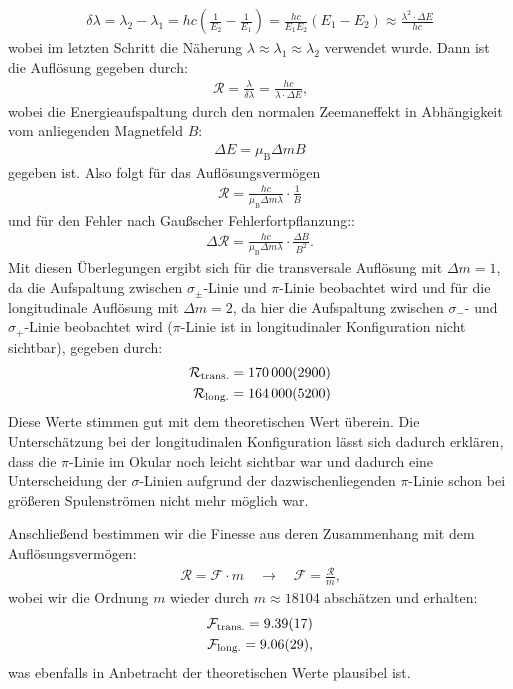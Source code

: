\documentclass[11pt, a4paper]{article}
\begin{document}
\begin{align}
	\delta \lambda = \lambda_2 - \lambda_1 = h c \left( \frac{1}{E_2} - \frac{1}{E_1} \right) = \frac{h c}{E_1 E_2} \left(E_1 - E_2\right) \approx \frac{\lambda^2 \cdot \Delta E}{h c}
\end{align}
wobei im letzten Schritt die Näherung $\lambda \approx \lambda_1 \approx \lambda_2$ verwendet wurde.
Dann ist die Auflösung gegeben durch:
\begin{align}
	\mathcal{R} = \frac{\lambda}{\delta \lambda} = \frac{h c}{\lambda \cdot \Delta E}\text{,}
\end{align}
wobei die Energieaufspaltung durch den normalen Zeemaneffekt in Abhängigkeit vom anliegenden Magnetfeld $B$:
\begin{align}
	\Delta E = \mu_\mathrm{B} \Delta m B
\end{align}
gegeben ist.
Also folgt für das Auflösungsvermögen
\begin{align}
	\mathcal{R} = \frac{h c}{ \mu_\mathrm{B} \Delta m \lambda} \cdot \frac{1}{B} 
\end{align}
und für den Fehler nach Gaußscher Fehlerfortpflanzung::
\begin{align}
	\Delta \mathcal{R} = \frac{h c}{ \mu_\mathrm{B} \Delta m \lambda} \cdot \frac{\Delta B}{B^2} \text{.}
\end{align}
Mit diesen Überlegungen ergibt sich für die transversale Auflösung mit $\Delta m = 1$, da die Aufspaltung zwischen $\sigma_\pm$-Linie und $\pi$-Linie beobachtet wird und für die longitudinale Auflösung mit $\Delta m = 2$, da hier die Aufspaltung zwischen $\sigma_-$- und $\sigma_+$-Linie beobachtet wird ($\pi$-Linie ist in longitudinaler Konfiguration nicht sichtbar), gegeben durch:
\begin{align*}
	\mathcal{R}_\mathrm{trans.} = \num{170000 +- 2900} \\
	\mathcal{R}_\mathrm{long.} =\num{164000 +- 5200}
\end{align*}
Diese Werte stimmen gut mit dem theoretischen Wert überein.
Die Unterschätzung bei der longitudinalen Konfiguration lässt sich dadurch erklären, dass die $\pi$-Linie im Okular noch leicht sichtbar war und dadurch eine Unterscheidung der $\sigma$-Linien aufgrund der dazwischenliegenden $\pi$-Linie schon bei größeren Spulenströmen nicht mehr möglich war.

Anschließend bestimmen wir die Finesse aus deren Zusammenhang mit dem Auflösungsvermögen:
\begin{align*}
\mathcal{R} = \mathcal{F} \cdot m \quad \rightarrow \quad \mathcal{F} = \frac{\mathcal{R}}{m}\text{,}                    
\end{align*}
wobei wir die Ordnung $m$ wieder durch $m \approx \num{18104}$ abschätzen und erhalten:
\begin{align*}
	\mathcal{F}_\mathrm{trans.} = \num{9.39 +- 0.17} \\
	\mathcal{F}_\mathrm{long.} = \num{9.06  +- 0.29}\text{,}
\end{align*}
was ebenfalls in Anbetracht der theoretischen Werte plausibel ist.
\end{document}
